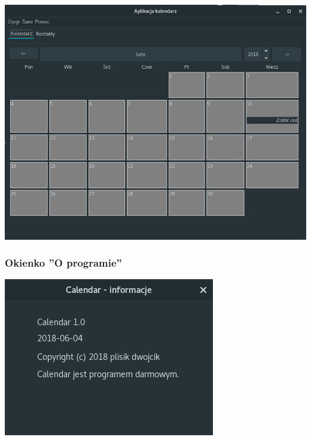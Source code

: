 \documentclass[a4paper,12pt]{article}
\begin{document}
\begin{minipage}{\textwidth}

    \includegraphics[width=\textwidth]{./screen/AppScreen/MainViewLinux.png}
    \label{MainViewLinux}

\end{minipage}

\subsubsection{Okienko ''O programie''}

\begin{center}
\begin{minipage}{0.5\textwidth}

    \includegraphics[width=\textwidth]{./screen/AppScreen/AboutDialog.png}
    \label{MainViewLinux}

\end{minipage}
\end{center}
\end{document}
